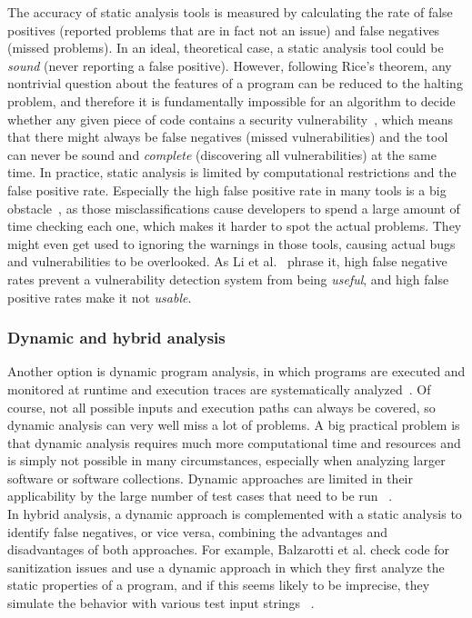 \documentclass[
a4paper,
pagesize,
pdftex,
12pt,
ngerman,
fleqn,
final,
]{scrartcl}
\begin{document}
	The accuracy of static analysis tools is measured by calculating the rate of false positives (reported problems that are in fact not an issue) and false negatives (missed problems). In an ideal, theoretical case, a static analysis tool could be \textit{sound} (never reporting a false positive). However, following Rice's theorem, any nontrivial question about the features of a program can be reduced to the halting problem, and therefore it is fundamentally impossible for an algorithm to decide whether any given piece of code contains a security vulnerability~\cite{Chess.2004}, which means that there might always be false negatives (missed vulnerabilities) and the tool can never be sound and \textit{complete} (discovering all vulnerabilities) at the same time. In practice, static analysis is limited by computational restrictions and the false positive rate. Especially the high false positive rate in many tools is a big obstacle~\cite{Liu.2018}, as those misclassifications cause developers to spend a large amount of time checking each one, which makes it harder to spot the actual problems. They might even get used to ignoring the warnings in those tools, causing actual bugs and vulnerabilities to be overlooked. As Li et al.~\cite{Li.2005} phrase it, high false negative rates prevent a vulnerability detection system from being \textit{useful}, and high false positive rates make it not \textit{usable}.\\
	
	\subsubsection{Dynamic and hybrid analysis}
	Another option is dynamic program analysis, in which programs are executed and monitored at runtime and execution traces are systematically analyzed~\cite{Shar.2013c}. Of course, not all possible inputs and execution paths can always be covered, so dynamic analysis can very well miss a lot of problems. A big practical problem is that dynamic analysis requires much more computational time and resources and is simply not possible in many circumstances, especially when analyzing larger software or software collections. Dynamic approaches are limited in their applicability by the large number of test cases that need to be run ~\cite{Aggarwal.2006}.\\
	In hybrid analysis, a dynamic approach is complemented with a static analysis to identify false negatives, or vice versa, combining the advantages and disadvantages of both approaches. For example, Balzarotti et al. check code for sanitization issues and use a dynamic approach in which they first analyze the static properties of a program, and if this seems likely to be imprecise, they simulate the behavior with various test input strings ~\cite{Balzarotti.2008}. 
	
\end{document}
